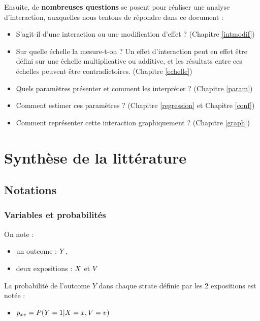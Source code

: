 \documentclass[
]{book}
\providecommand{\tightlist}{%
  \setlength{\itemsep}{0pt}\setlength{\parskip}{0pt}}
\begin{document}
Ensuite, de \textbf{nombreuses questions} se posent pour réaliser une analyse d'interaction, auxquelles nous tentons de répondre dans ce document :

\begin{itemize}
\tightlist
\item
  S'agit-il d'une interaction ou une modification d'effet ? (Chapitre \ref{intmodif})
\item
  Sur quelle échelle la mesure-t-on ? Un effet d'interaction peut en effet être défini sur une échelle multiplicative ou additive, et les résultats entre ces échelles peuvent être contradictoires. (Chapitre \ref{echelle})
\item
  Quels paramètres présenter et comment les interpréter ? (Chapitre \ref{param})
\item
  Comment estimer ces paramètres ? (Chapitre \ref{regression} et Chapitre \ref{conf})
\item
  Comment représenter cette interaction graphiquement ? (Chapitre \ref{graph})
\end{itemize}

\hypertarget{part-synthuxe8se-de-la-littuxe9rature}{%
\part{Synthèse de la littérature}\label{part-synthuxe8se-de-la-littuxe9rature}}

\hypertarget{notations}{%
\chapter{Notations}\label{notations}}

\hypertarget{variables-et-probabilituxe9s}{%
\section{Variables et probabilités}\label{variables-et-probabilituxe9s}}

On note :

\begin{itemize}
\tightlist
\item
  un outcome : \(\small Y\),
\item
  deux expositions : \(\small X\) et \(\small V\)
\end{itemize}

La probabilité de l'outcome \(Y\) dans chaque strate définie par les 2 expositions est notée :

\begin{itemize}
\tightlist
\item
  \(\small p_{xv} = P(Y = 1|X = x,V = v)\)
\end{itemize}
\end{document}
